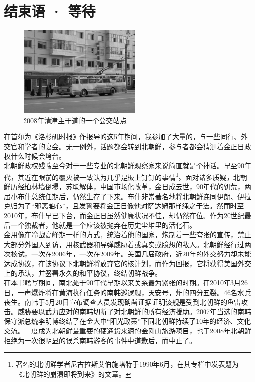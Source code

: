 \fancyhead[RO]{\thepage}
\fancyhead[LE]{\thepage}
\fancyfoot[LE,RO]{}
\fancyfoot[LO,CE]{}
\fancyfoot[CO,RE]{}
\chapter*{结束语 · 等待}
\begin{figure}[!htbp]
	\centering
	\includegraphics[width=6cm]{./Chapters/Images/21.jpg}
	\caption*{2008年清津主干道的一个公交站点}
\end{figure}


在首尔为《洛杉矶时报》作报导的这5年期间，我参加了大量的，与一些同行、外交官和学者的宴会。无一例外，话题都会转到北朝鲜，参与者都会猜测着金正日政权什么时候会垮台。\\

北朝鲜政权残喘至今对于一些专业的北朝鲜观察家来说简直就是个神话。早至90年代，其近在眼前的覆灭被一致认为几乎是板上钉钉的事情\footnote{著名的北朝鲜学者尼古拉斯艾伯施塔特于1990年6月，在其专栏中发表题为《北朝鲜的崩溃即将到来》的文章。}。面对诸多质疑，北朝鲜历经柏林墙倒塌，苏联解体，中国市场化改革，金日成去世，90年代的饥荒，两届小布什总统任期后，仍然生存了下来。布什非常著名地将北朝鲜连同伊朗、伊拉克归为了“邪恶轴心”，且发誓要将金正日像他对萨达姆那样绳之于法。然而时至2010年，布什早已下台，而金正日虽然健康状况不佳，却仍然在位。作为20世纪最后一个独裁者，他就是一个应该被抛弃在历史尘堆里的活化石。\\

金用像在冷战高峰期一样的方式，统治着他的国家，炮制着一些夸张的宣传，禁止大部分外国人到访，用核武器和导弹威胁着或真实或臆想的敌人。北朝鲜经行过两次核试，一次在2006年，一次在2009年。美国几届政府，近20年的外交努力却未能达成协议，在该协议下北朝鲜将放弃它的核计划，而作为回报，它将获得美国外交上的承认，并签署永久的和平协议，终结朝鲜战争。\\

在本书籍写期间，南北处于90年代早期以来关系最为紧张的时期。在2010年3月26日，一声爆炸将在黄海执行任务的南韩巡逻舰，天安号，炸的四分五裂。46名水兵丧生。南韩于5月20日宣布调查人员发现确凿证据证明该舰是受到北朝鲜的鱼雷攻击。威胁要以武力应对的南韩切断了对北朝鲜的所有经济援助。2007年当选的南韩保守派总统李明博终结了在金大中“阳光政策”下同北朝鲜持续了10年的经济、文化交流。一度成为北朝鲜最重要的硬通货来源的金刚山旅游项目，也于2008年北朝鲜拒绝为一次很明显的误杀南韩游客的事件中道歉后，而中止了。\\

